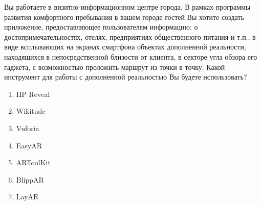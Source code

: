 
Вы работаете в визитно-информационном центре города. В рамках программы развития комфортного пребывания в вашем городе гостей Вы хотите создать приложение, предоставляющее пользователям информацию: о достопримечательностях, отелях, предприятиях общественного питания и т.п., в виде всплывающих на экранах смартфона объектах дополненной реальности, находящихся в непосредственной близости от клиента, в секторе угла обзора его гаджета, с возможностью проложить маршрут из точки в точку. Какой инструмент для работы с дополненной реальностью Вы будете использовать?

\begin{enumerate}
    \item HP Reveal
    \item Wikitude
    \item Vuforia
    \item EasyAR
    \item ARToolKit
    \item BlippAR
    \item LayAR
\end{enumerate}

